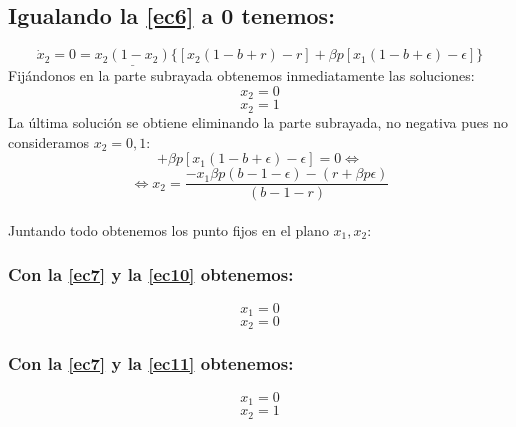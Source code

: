 \documentclass[11pt]{article}
\begin{document}
\newpage

\subsection*{Igualando la \autoref{ec6} a 0 tenemos:}
\begin{equation*}
\dot{x}_2=0=\underline{x_2(1-x_2)}\lbrace [x_2(1-b+r)-r]+\beta p[x_1(1-b+\epsilon)-\epsilon]\rbrace
\end{equation*}
Fijándonos en la parte subrayada obtenemos inmediatamente las soluciones:
\begin{equation}\label{ec10}
x_2=0
\end{equation}
\begin{equation}\label{ec11}
x_2=1
\end{equation}
La última solución se obtiene eliminando la parte subrayada, no  negativa pues no consideramos $x_2=0,1$:
\begin{equation*}
[x_2(1-b+r)-r]+\beta p[x_1(1-b+\epsilon)-\epsilon]=0\Longleftrightarrow
\end{equation*}
\begin{equation}\label{ec12}
\Longleftrightarrow x_2=\dfrac{-x_1\beta p(b-1-\epsilon)-(r+\beta p\epsilon)}{(b-1-r)}
\end{equation}\\

Juntando todo obtenemos los punto fijos en el plano $x_1,x_2$:

\subsubsection*{Con la \autoref{ec7} y la \autoref{ec10} obtenemos:}
\vspace{-0.7cm}
\begin{equation}\label{ec13}
x_1=0
\end{equation}
\begin{equation}\label{ec14}
x_2=0
\end{equation}

\subsubsection*{Con la \autoref{ec7} y la \autoref{ec11} obtenemos:}
\vspace{-0.7cm}
\begin{equation}\label{ec15}
x_1=0
\end{equation}
\begin{equation}\label{ec16}
x_2=1
\end{equation}
\end{document}
